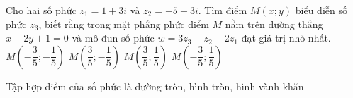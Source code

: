 \begin{ex}%
	Cho hai số phức $z_1=1+3i$ và $z_2=-5-3i$. Tìm điểm $M(x;y)$ biểu diễn số phức $z_3$, biết rằng trong mặt phẳng phức điểm $M$ nằm trên đường thẳng $x-2y+1=0$ và mô-đun số phức $w=3z_3-z_2-2z_1$ đạt giá trị nhỏ nhất.
	\choice
	{$M\left(-\dfrac{3}{5};-\dfrac{1}{5}\right)$}
	{$M\left(\dfrac{3}{5};-\dfrac{1}{5}\right)$}
	{$M\left(\dfrac{3}{5};\dfrac{1}{5}\right)$}
	{\True $M\left(-\dfrac{3}{5};\dfrac{1}{5}\right)$}
\end{ex}

\begin{dang}{Tập hợp điểm của số phức là đường tròn, hình tròn, hình vành khăn}
\end{dang}

